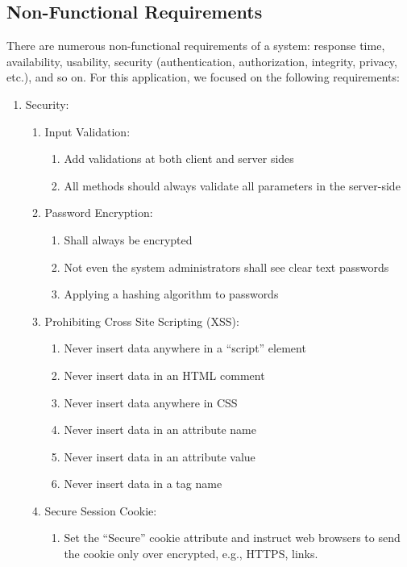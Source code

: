 \subsection{Non-Functional Requirements}
\label{sec:Requirements>Non-Functional Requirements}
There are numerous non-functional requirements of a system: response time, availability, usability, security (authentication, authorization, integrity, privacy, etc.), and so on. For this application, we focused on the following requirements:
\begin{enumerate}
  \item Security:
  \begin{enumerate}
    \item Input Validation:
    \begin{enumerate}
      \item Add validations at both client and server sides
      \item All methods should always validate all parameters in the server-side
    \end{enumerate}
    \item Password Encryption:
    \begin{enumerate}
      \item Shall always be encrypted
      \item Not even the system administrators shall see clear text passwords
      \item Applying a hashing algorithm to passwords
    \end{enumerate}
    \item Prohibiting Cross Site Scripting (XSS):
    \begin{enumerate}
      \item Never insert data anywhere in a ``script'' element
      \item Never insert data in an HTML comment
      \item Never insert data anywhere in CSS
      \item Never insert data in an attribute name
      \item Never insert data in an attribute value
      \item Never insert data in a tag name
    \end{enumerate}
    \item Secure Session Cookie:
    \begin{enumerate}
      \item Set the ``Secure'' cookie attribute and instruct web browsers to send the cookie only over encrypted, e.g., HTTPS, links.

\end{enumerate}
\end{enumerate}
\end{enumerate}
